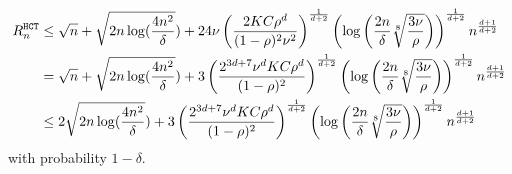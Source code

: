 \begin{align*}
    R_n^{\texttt{HCT}} & \leq \sqrt{n} + \sqrt{2n\operatorname{log}(\frac{4n^2}{\delta}}) + 24\nu\left(\frac{2KC\rho^d}{(1-\rho)^2\nu^2}\right)^{\frac{1}{d+2}}\left(\operatorname{log}\left(\frac{2n}{\delta}\sqrt[8]{\frac{3\nu}{\rho}}\right)\right)^{\frac{1}{d+2}}n^{\frac{d+1}{d+2}} \\
                              & = \sqrt{n} + \sqrt{2n\operatorname{log}(\frac{4n^2}{\delta}}) + 3\left(\frac{2^{3d+7}\nu^d KC\rho^d}{(1-\rho)^{2}}\right)^{\frac{1}{d+2}}\left(\operatorname{log}\left(\frac{2n}{\delta}\sqrt[8]{\frac{3\nu}{\rho}}\right)\right)^{\frac{1}{d+2}}n^{\frac{d+1}{d+2}} \\
                              & \leq 2\sqrt{2n\operatorname{log}(\frac{4n^2}{\delta}}) + 3\left(\frac{2^{3d+7}\nu^d KC\rho^d}{(1-\rho)^{2}}\right)^{\frac{1}{d+2}}\left(\operatorname{log}\left(\frac{2n}{\delta}\sqrt[8]{\frac{3\nu}{\rho}}\right)\right)^{\frac{1}{d+2}}n^{\frac{d+1}{d+2}}
\end{align*}
with probability $1-\delta$.
